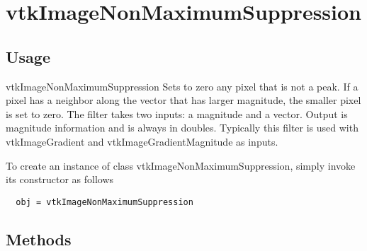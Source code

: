 \section{vtkImageNonMaximumSuppression}

\subsection{Usage}

 vtkImageNonMaximumSuppression Sets to zero any pixel that is not a peak.
 If a pixel has a neighbor along the vector that has larger magnitude, the
 smaller pixel is set to zero.  The filter takes two inputs: a magnitude
 and a vector.  Output is magnitude information and is always in doubles.
 Typically this filter is used with vtkImageGradient and
 vtkImageGradientMagnitude as inputs.

To create an instance of class vtkImageNonMaximumSuppression, simply
invoke its constructor as follows
\begin{verbatim}
  obj = vtkImageNonMaximumSuppression
\end{verbatim}
\subsection{Methods}

